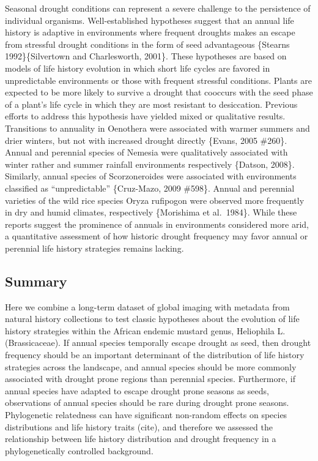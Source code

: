 \documentclass[man,floatsintext]{apa6}
\theoremstyle{definition}
\theoremstyle{definition}
\theoremstyle{definition}
\theoremstyle{remark}
\begin{document}
Seasonal drought conditions can represent a severe challenge to the
persistence of individual organisms. Well-established hypotheses suggest
that an annual life history is adaptive in environments where frequent
droughts makes an escape from stressful drought conditions in the form
of seed advantageous \{Stearns 1992\}\{Silvertown and Charlesworth,
2001\}. These hypotheses are based on models of life history evolution
in which short life cycles are favored in unpredictable environments or
those with frequent stressful conditions. Plants are expected to be more
likely to survive a drought that cooccurs with the seed phase of a
plant's life cycle in which they are most resistant to desiccation.
Previous efforts to address this hypothesis have yielded mixed or
qualitative results. Transitions to annuality in Oenothera were
associated with warmer summers and drier winters, but not with increased
drought directly \{Evans, 2005 \#260\}. Annual and perennial species of
Nemesia were qualitatively associated with winter rather and summer
rainfall environments respectively \{Datson, 2008\}. Similarly, annual
species of Scorzoneroides were associated with environments classified
as \enquote{unpredictable} \{Cruz-Mazo, 2009 \#598\}. Annual and
perennial varieties of the wild rice species Oryza rufipogon were
observed more frequently in dry and humid climates, respectively
\{Morishima et al.~1984\}. While these reports suggest the prominence of
annuals in environments considered more arid, a quantitative assessment
of how historic drought frequency may favor annual or perennial life
history strategies remains lacking.

\hypertarget{summary}{%
\subsection{Summary}\label{summary}}

Here we combine a long-term dataset of global imaging with metadata from
natural history collections to test classic hypotheses about the
evolution of life history strategies within the African endemic mustard
genus, Heliophila L. (Brassicaceae). If annual species temporally escape
drought as seed, then drought frequency should be an important
determinant of the distribution of life history strategies across the
landscape, and annual species should be more commonly associated with
drought prone regions than perennial species. Furthermore, if annual
species have adapted to escape drought prone seasons as seeds,
observations of annual species should be rare during drought prone
seasons. Phylogenetic relatedness can have significant non-random
effects on species distributions and life history traits (cite), and
therefore we assessed the relationship between life history distribution
and drought frequency in a phylogenetically controlled background.
\end{document}
